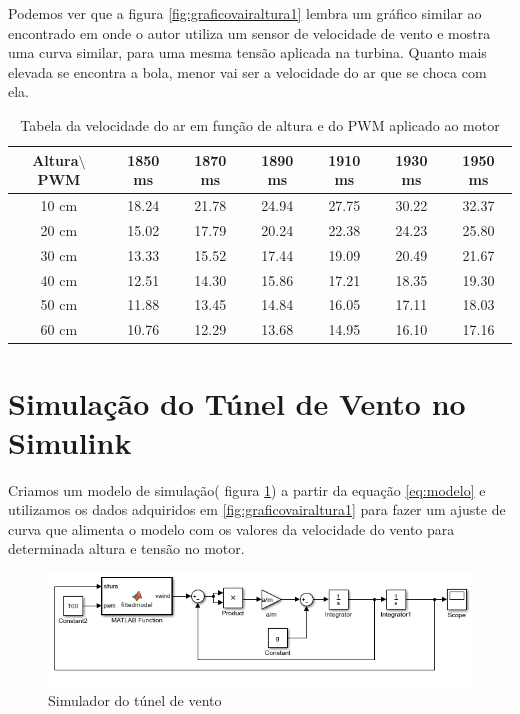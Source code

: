 Podemos ver que a figura \ref{fig:graficovairaltura1} lembra um gráfico similar ao encontrado em \cite{jernigan2009} onde o autor utiliza um sensor de velocidade de vento e mostra uma curva similar, para uma mesma tensão aplicada na turbina. Quanto mais elevada se encontra a bola, menor vai ser a velocidade do ar que se choca com ela.

\begin{table}[htb]
	\centering
\begin{tabular}{|c|c|c|c|c|c|c|}
	\hline 
	Altura$\setminus$PWM & 1850 ms & 1870 ms & 1890 ms & 1910 ms & 1930 ms & 1950 ms \\ 
	\hline 
	10 cm & 18.24 & 21.78 & 24.94 & 27.75 & 30.22 & 32.37 \\ 
	\hline 
	20 cm & 15.02 & 17.79 & 20.24 & 22.38 & 24.23 & 25.80 \\ 
	\hline 
	30 cm & 13.33 & 15.52 & 17.44 & 19.09 & 20.49 & 21.67 \\ 
	\hline 
	40 cm & 12.51 & 14.30 & 15.86 & 17.21 & 18.35 & 19.30 \\ 
	\hline 
	50 cm & 11.88 & 13.45 & 14.84 & 16.05 & 17.11 & 18.03 \\ 
	\hline 
	60 cm & 10.76 & 12.29 & 13.68 & 14.95 & 16.10 & 17.16 \\ 
	\hline 
\end{tabular} 
\caption{Tabela da velocidade do ar em função de altura e do PWM aplicado ao motor}
\label{tb:varxalturapwm}
\end{table}

\section{Simulação do Túnel de Vento no Simulink}

Criamos um modelo de simulação( figura \ref{fig:simulador}) a partir da equação \ref{eq:modelo} e utilizamos os dados adquiridos em \ref{fig:graficovairaltura1} para fazer um ajuste de curva que alimenta o modelo com os valores da velocidade do vento para determinada altura e tensão no motor.

\begin{figure}[htb]
	\centering
	\includegraphics[width=1\linewidth]{simulador}
	\caption[Simulador do túnel de vento]{Simulador do túnel de vento}
	\label{fig:simulador}
\end{figure}

